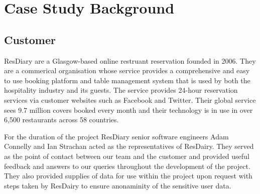 \documentclass{l3proj}
\begin{document}
\newpage


\section{Case Study Background}
\label{sec:background}


\subsection{Customer}
\label{customer}



ResDiary are a Glasgow-based online restruant reservation founded in 2006. They are a commerical organisation whose service provides a comprehensive and easy to use booking platform and table management system that is used by both the hospitality industry and its guests. The service provides 24-hour reservation services via customer websites such as Facebook and Twitter. Their global service sees 9.7 million covers booked every month and their technology is in use in over 6,500 restaurants across 58 countries.

For the duration of the project ResDiary senior software engineers Adam Connelly and Ian Strachan acted as the representatives of ResDairy. They served as the point of contact between our team and the customer and provided useful feedback and answers to our queries throughout the development of the project. They also provided supplies of data for use within the project upon request with steps taken by ResDairy to ensure anonaminity of the sensitive user data.
\end{document}
